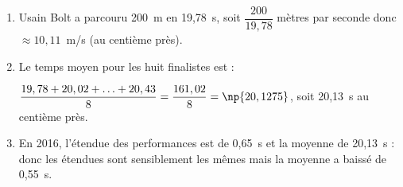 
\medskip

%
%

\begin{enumerate}
\item %
Usain Bolt a parcouru 200~m en 19,78~s, soit $\dfrac{200}{19,78}$ mètres par seconde donc $ \approx 10,11$~m/s (au centième près).
\item %
Le temps moyen pour les huit finalistes est :

$\dfrac{19,78 + 20,02 + \ldots + 20,43}{8} = \dfrac{161,02}{8} = \np{20,1275}$, soit 20,13~s au centième près.
\item %
En 2016, l'étendue des performances est de 0,65~s et la moyenne de 20,13~s : donc les étendues sont sensiblement les mêmes mais la moyenne  a baissé de 0,55~s.
\end{enumerate}

\bigskip


